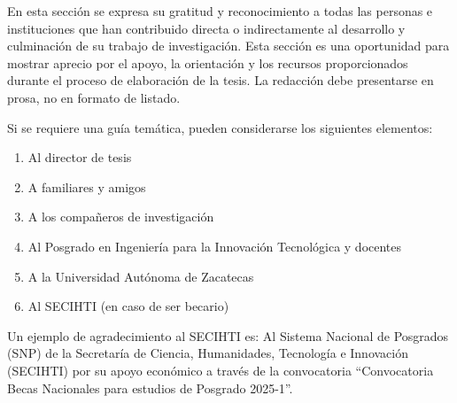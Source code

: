 En esta sección se expresa su gratitud y reconocimiento a todas las personas e instituciones que han contribuido directa o indirectamente al desarrollo y culminación de su trabajo de investigación. Esta sección es una oportunidad para mostrar aprecio por el apoyo, la orientación y los recursos proporcionados durante el proceso de elaboración de la tesis. La redacción debe presentarse en prosa, no en formato de listado.

Si se requiere una guía temática, pueden considerarse los siguientes elementos:

\begin{enumerate}
    \item Al director de tesis
    \item A familiares y amigos
    \item A los compañeros de investigación
    \item Al Posgrado en Ingeniería para la Innovación Tecnológica y docentes
    \item A la Universidad Autónoma de Zacatecas
    \item Al SECIHTI (en caso de ser becario)
\end{enumerate}

Un ejemplo de agradecimiento al SECIHTI es: Al Sistema Nacional de Posgrados (SNP) de la  Secretaría de Ciencia, Humanidades, Tecnología e Innovación (SECIHTI) por su apoyo económico a través de la convocatoria ``Convocatoria Becas Nacionales para estudios de Posgrado 2025-1''.